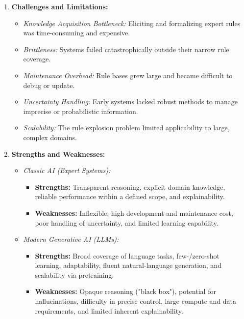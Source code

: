 \documentclass[12pt]{article}
\begin{document}
\begin{enumerate}
  \item \textbf{Challenges and Limitations:}
    \begin{itemize}
      \item \emph{Knowledge Acquisition Bottleneck:} Eliciting and formalizing expert rules was time-consuming and expensive.
      \item \emph{Brittleness:} Systems failed catastrophically outside their narrow rule coverage.
      \item \emph{Maintenance Overhead:} Rule bases grew large and became difficult to debug or update.
      \item \emph{Uncertainty Handling:} Early systems lacked robust methods to manage imprecise or probabilistic information.
      \item \emph{Scalability:} The rule explosion problem limited applicability to large, complex domains.
    \end{itemize}

  \item \textbf{Strengths and Weaknesses:}
    \begin{itemize}
      \item \emph{Classic AI (Expert Systems):}
        \begin{itemize}
          \item \textbf{Strengths:} Transparent reasoning, explicit domain knowledge, reliable performance within a defined scope, and explainability.
          \item \textbf{Weaknesses:} Inflexible, high development and maintenance cost, poor handling of uncertainty, and limited learning capability.
        \end{itemize}
      \item \emph{Modern Generative AI (LLMs):}
        \begin{itemize}
          \item \textbf{Strengths:} Broad coverage of language tasks, few-/zero-shot learning, adaptability, fluent natural-language generation, and scalability via pretraining.
          \item \textbf{Weaknesses:} Opaque reasoning ("black box"), potential for hallucinations, difficulty in precise control, large compute and data requirements, and limited inherent explainability.
        \end{itemize}
    \end{itemize}

\end{enumerate}
\end{document}
